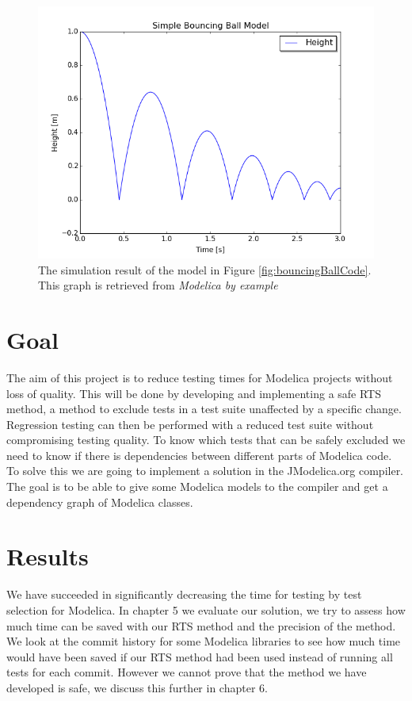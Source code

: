 \documentclass{cslthse-msc}
\begin{document}
\begin{figure}[!htbp]
    \centering
    \includegraphics[width=1.0\textwidth]{Pictures/BB1.png}
    \caption{The simulation result of the model in Figure \ref{fig:bouncingBallCode}. This graph is retrieved from \textit{Modelica by example} \cite{tillermodelica}}
    \label{fig:bouncingBallSimulation}
\end{figure}

\section{Goal}
The aim of this project is to reduce testing times for Modelica projects without loss of quality. This will be done by developing and implementing a safe RTS method, a method to exclude tests in a test suite unaffected by a specific change. \cite{DBLP:conf/pppj/OqvistHM16} Regression testing can then be performed with a reduced test suite without compromising testing quality. To know which tests that can be safely excluded we need to know if there is dependencies between different parts of Modelica code. To solve this we are going to implement a solution in the JModelica.org compiler. The goal is to be able to give some Modelica models to the compiler and get a dependency graph of Modelica classes.

\section{Results}
We have succeeded in significantly decreasing the time for testing by test selection for Modelica. In chapter 5 we evaluate our solution, we try to assess how much time can be saved with our RTS method and the precision of the method. We look at the commit history for some Modelica libraries to see how much time would have been saved if our RTS method had been used instead of running all tests for each commit. However we cannot prove that the method we have developed is safe, we discuss this further in chapter 6.
\end{document}
